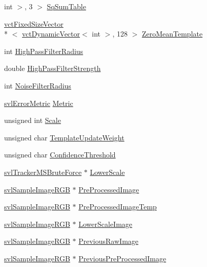 \begin{DoxyCompactItemize}
int $>$, 3 $>$ \hyperlink{classsvl_tracker_m_s_brute_force_ac8d7ec3446ee26262b3988d2257fd1f3}{Sq\-Sum\-Table}
\item 
\hyperlink{classvct_fixed_size_vector}{vct\-Fixed\-Size\-Vector}\\*
$<$ \hyperlink{classvct_dynamic_vector}{vct\-Dynamic\-Vector}$<$ int $>$, 128 $>$ \hyperlink{classsvl_tracker_m_s_brute_force_abc0f2604ffefdaeb0cca4d5653edf099}{Zero\-Mean\-Template}
\item 
int \hyperlink{classsvl_tracker_m_s_brute_force_a5d2f61d237e1ba77ef98d12c2c7f8af0}{High\-Pass\-Filter\-Radius}
\item 
double \hyperlink{classsvl_tracker_m_s_brute_force_a1b8a2ad541bd774a0618c78b6c57c4c6}{High\-Pass\-Filter\-Strength}
\item 
int \hyperlink{classsvl_tracker_m_s_brute_force_a8b1f609a7cffb5680c15ad1eb6dd6de4}{Noise\-Filter\-Radius}
\item 
\hyperlink{svl_definitions_8h_ade0b97ec3319ac710d7478dd2b608727}{svl\-Error\-Metric} \hyperlink{classsvl_tracker_m_s_brute_force_a4a57d6c469da0e33705764236ea91f01}{Metric}
\item 
unsigned int \hyperlink{classsvl_tracker_m_s_brute_force_a11a762940bf3cd20ee15c6719fc01c3d}{Scale}
\item 
unsigned char \hyperlink{classsvl_tracker_m_s_brute_force_ab88fcbddc49c7020a7e86693ddd68c51}{Template\-Update\-Weight}
\item 
unsigned char \hyperlink{classsvl_tracker_m_s_brute_force_ad6790c4ae886e44532664882276d2bfd}{Confidence\-Threshold}
\item 
\hyperlink{classsvl_tracker_m_s_brute_force}{svl\-Tracker\-M\-S\-Brute\-Force} $\ast$ \hyperlink{classsvl_tracker_m_s_brute_force_a2dc875593484e49b66d784181e1ec3aa}{Lower\-Scale}
\item 
\hyperlink{svl_sample_image_types_8h_a54a55112dd3879f71f990d2945375f1a}{svl\-Sample\-Image\-R\-G\-B} $\ast$ \hyperlink{classsvl_tracker_m_s_brute_force_ad180d6f5e193c25793a558bc6ca110fa}{Pre\-Processed\-Image}
\item 
\hyperlink{svl_sample_image_types_8h_a54a55112dd3879f71f990d2945375f1a}{svl\-Sample\-Image\-R\-G\-B} $\ast$ \hyperlink{classsvl_tracker_m_s_brute_force_acb1c53a35d943e3f614519a14eb38c60}{Pre\-Processed\-Image\-Temp}
\item 
\hyperlink{svl_sample_image_types_8h_a54a55112dd3879f71f990d2945375f1a}{svl\-Sample\-Image\-R\-G\-B} $\ast$ \hyperlink{classsvl_tracker_m_s_brute_force_a762b3810ed7aa7f48500567e5dbb2de6}{Lower\-Scale\-Image}
\item 
\hyperlink{svl_sample_image_types_8h_a54a55112dd3879f71f990d2945375f1a}{svl\-Sample\-Image\-R\-G\-B} $\ast$ \hyperlink{classsvl_tracker_m_s_brute_force_acd953504f3298ec761d2dbf027c8b251}{Previous\-Raw\-Image}
\item 
\hyperlink{svl_sample_image_types_8h_a54a55112dd3879f71f990d2945375f1a}{svl\-Sample\-Image\-R\-G\-B} $\ast$ \hyperlink{classsvl_tracker_m_s_brute_force_a12bc5e5e5c92916372982f0d9b72a7c1}{Previous\-Pre\-Processed\-Image}
\end{DoxyCompactItemize}


